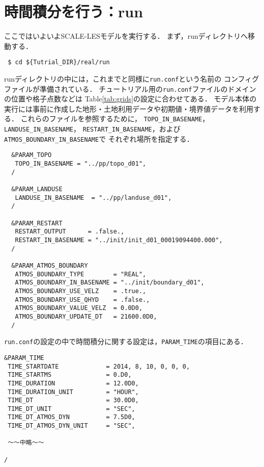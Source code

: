 
\section{時間積分を行う：run}

ここではいよいよSCALE-LESモデルを実行する．
まず，runディレクトリへ移動する．
\begin{verbatim}
 $ cd ${Tutrial_DIR}/real/run
\end{verbatim}

runディレクトリの中には，これまでと同様に\verb|run.conf|という名前の
コンフィグファイルが準備されている．
チュートリアル用の\verb|run.conf|ファイルのドメインの位置や格子点数などは
Table\ref{tab:grids}の設定に合わせてある．
モデル本体の実行には事前に作成した地形・土地利用データや初期値・境界値データを利用する．
これらのファイルを参照するために，
\verb|TOPO_IN_BASENAME|，\verb|LANDUSE_IN_BASENAME|，
\verb|RESTART_IN_BASENAME|，および\verb|ATMOS_BOUNDARY_IN_BASENAME|で
それぞれ場所を指定する．

\begin{verbatim}
  &PARAM_TOPO
   TOPO_IN_BASENAME = "../pp/topo_d01",
  /

  &PARAM_LANDUSE
   LANDUSE_IN_BASENAME  = "../pp/landuse_d01",
  /

  &PARAM_RESTART
   RESTART_OUTPUT      = .false.,
   RESTART_IN_BASENAME = "../init/init_d01_00019094400.000",
  /

  &PARAM_ATMOS_BOUNDARY
   ATMOS_BOUNDARY_TYPE        = "REAL",
   ATMOS_BOUNDARY_IN_BASENAME = "../init/boundary_d01",
   ATMOS_BOUNDARY_USE_VELZ    = .true.,
   ATMOS_BOUNDARY_USE_QHYD    = .false.,
   ATMOS_BOUNDARY_VALUE_VELZ  = 0.0D0,
   ATMOS_BOUNDARY_UPDATE_DT   = 21600.0D0,
  /

\end{verbatim}


\verb|run.conf|の設定の中で時間積分に関する設定は，\verb|PARAM_TIME|の項目にある．
\begin{verbatim}
&PARAM_TIME
 TIME_STARTDATE             = 2014, 8, 10, 0, 0, 0,
 TIME_STARTMS               = 0.D0,
 TIME_DURATION              = 12.0D0,
 TIME_DURATION_UNIT         = "HOUR",
 TIME_DT                    = 30.0D0,
 TIME_DT_UNIT               = "SEC",
 TIME_DT_ATMOS_DYN          = 7.5D0,
 TIME_DT_ATMOS_DYN_UNIT     = "SEC",

 ～～中略～～

/
\end{verbatim}

